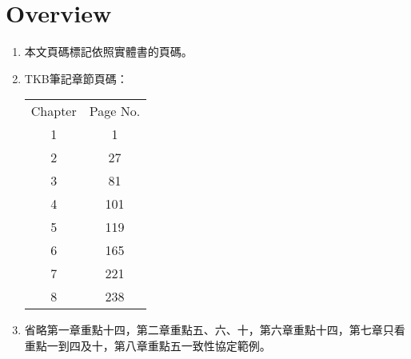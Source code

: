 \section{Overview}

\begin{enumerate}
    \item 本文頁碼標記依照實體書\cite{1}\cite{2}的頁碼。
    \item TKB筆記\cite{3}章節頁碼：
    \begin{table}[H]
        \centering
        \begin{tabular}{|c|c|}
            \hline
            Chapter & Page No. \\
            \Xhline{2\arrayrulewidth}
            1 & 1 \\
            \hline
            2 & 27 \\
            \hline
            3 & 81 \\
            \hline
            4 & 101 \\
            \hline
            5 & 119 \\
            \hline
            6 & 165 \\
            \hline
            7 & 221 \\
            \hline
            8 & 238 \\
            \hline
        \end{tabular}
    \end{table}
    \item 省略第一章重點十四，第二章重點五、六、十，第六章重點十四，第七章只看重點一到四及十，第八章重點五一致性協定範例。
\end{enumerate}

\pagebreak